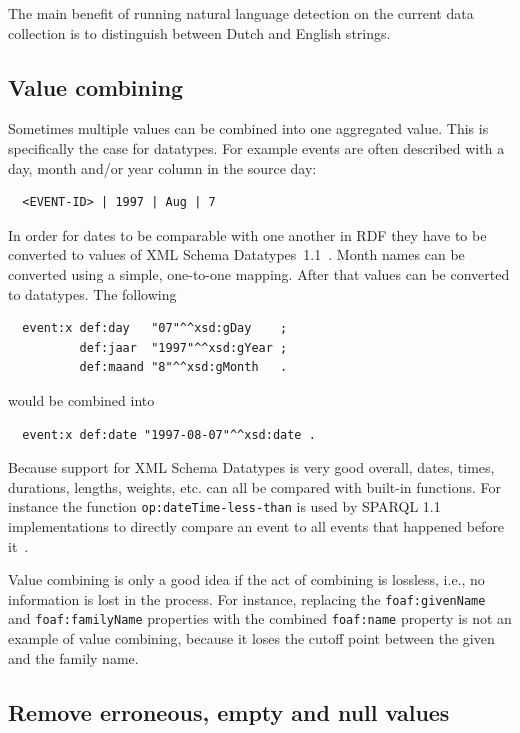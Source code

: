 \documentclass[a4paper]{scrartcl}
\newcommand{\textt}[1]{{\small \texttt{#1}}}
\begin{document}
The main benefit of running natural language detection on the current
data collection is to distinguish between Dutch and English strings.


\subsection{Value combining}
\label{sec:value_combining}

Sometimes multiple values can be combined into one aggregated value.
This is specifically the case for datatypes.  For example events are
often described with a day, month and/or year column in the source
day:

\begin{verbatim}
  <EVENT-ID> | 1997 | Aug | 7
\end{verbatim}

In order for dates to be comparable with one another in RDF they have
to be converted to values of XML Schema
Datatypes~1.1~\cite{Peterson2012}.  Month names can be converted using
a simple, one-to-one mapping.  After that values can be converted
to datatypes.  The following

\begin{verbatim}
  event:x def:day   "07"^^xsd:gDay    ;
          def:jaar  "1997"^^xsd:gYear ;
          def:maand "8"^^xsd:gMonth   .
\end{verbatim}

would be combined into

\begin{verbatim}
  event:x def:date "1997-08-07"^^xsd:date .
\end{verbatim}

Because support for XML Schema Datatypes is very good overall, dates,
times, durations, lengths, weights, etc. can all be compared with
built-in functions.  For instance the function
\textt{op:dateTime-less-than} is used by SPARQL 1.1 implementations to
directly compare an event to all events that happened before
it~\cite{Malhotra2015}.

Value combining is only a good idea if the act of combining is
lossless, i.e., no information is lost in the process.  For instance,
replacing the \textt{foaf:givenName} and \textt{foaf:familyName}
properties with the combined \textt{foaf:name} property is not an
example of value combining, because it loses the cutoff point between
the given and the family name.


\subsection{Remove erroneous, empty and null values}
\end{document}
